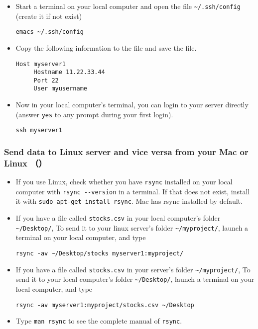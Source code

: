 \documentclass{article}
\begin{document}
\begin{itemize}
\item
  Start a terminal on your local computer and open the file
  \texttt{\textasciitilde{}/.ssh/config} (create it if not exist)

\begin{verbatim}
emacs ~/.ssh/config
\end{verbatim}
\item
  Copy the following information to the file and save the file.

\begin{verbatim}
Host myserver1
     Hostname 11.22.33.44
     Port 22
     User myusername
\end{verbatim}
\item
  Now in your local computer's terminal, you can login to your server
  directly (answer \texttt{yes} to any prompt during your first login).

\begin{verbatim}
ssh myserver1
\end{verbatim}
\end{itemize}

\subsubsection{Send data to Linux server and vice versa from your Mac or
Linux
（）}\label{send-data-to-linux-server-and-vice-versa-from-your-mac-or-linux}

\begin{itemize}
\item
  If you use Linux, check whether you have \texttt{rsync} installed on
  your local computer with \texttt{rsync -\/-version} in a terminal. If
  that does not exist, install it with
  \texttt{sudo apt-get install rsync}. Mac has rsync installed by
  default.
\item
  If you have a file called \texttt{stocks.csv} in your local computer's
  folder \texttt{\textasciitilde{}/Desktop/}, To send it to your linux
  server's folder \texttt{\textasciitilde{}/myproject/}, launch a
  terminal on your local computer, and type

\begin{verbatim}
rsync -av ~/Desktop/stocks myserver1:myproject/
\end{verbatim}
\item
  If you have a file called \texttt{stocks.csv} in your server's folder
  \texttt{\textasciitilde{}/myproject/}, To send it to your local
  computer's folder \texttt{\textasciitilde{}/Desktop/}, launch a
  terminal on your local computer, and type

\begin{verbatim}
rsync -av myserver1:myproject/stocks.csv ~/Desktop
\end{verbatim}
\item
  Type \texttt{man rsync} to see the complete manual of \texttt{rsync}.
\end{itemize}
\end{document}

